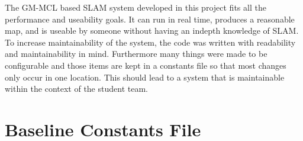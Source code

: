 \documentclass[10pt]{IEEEtran}
\begin{document}
The GM-MCL based SLAM system developed in this project fits all the performance and 
useability goals.  It can run in real time, produces a reasonable map, and is useable by
someone without having an indepth knowledge of SLAM.  To increase maintainability of the
system, the code was written with readability and maintainability in mind.  Furthermore many
things were made to be configurable and those items are kept in a constants
file so that most changes only occur in one location.  This should lead to a system that
is maintainable within the context of the student team.





\newpage
\onecolumn
\appendix
\section{Baseline Constants File}
\end{document}
